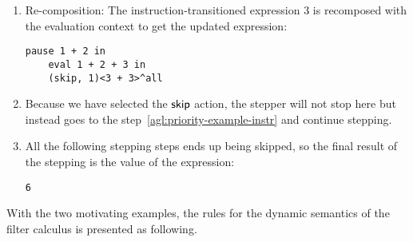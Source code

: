 \begin{enumerate}
  \item Re-composition: The instruction-transitioned expression \(3\) is recomposed with the evaluation context to get the updated expression:
  \begin{lstlisting}[language=hazel]
    pause 1 + 2 in
    eval 1 + 2 + 3 in
    (skip, 1)<3 + 3>^all
  \end{lstlisting}

  \item Because we have selected the \(\mathsf{skip}\) action, the stepper will not stop here but instead goes to the step~\ref{agl:priority-example-instr} and continue stepping.

  \item All the following stepping steps ends up being skipped, so the final result of the stepping is the value of the expression:
  \begin{lstlisting}[language=hazel]
    6
  \end{lstlisting}
\end{enumerate}

With the two motivating examples, the rules for the dynamic semantics of the filter calculus is presented as following.






